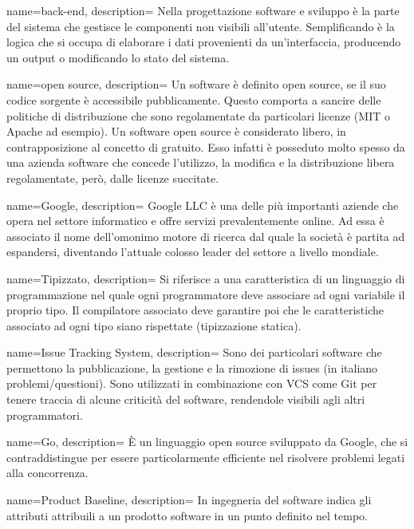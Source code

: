 {
  name=back-end,
  description={ Nella progettazione software e sviluppo è la parte del sistema che gestisce le componenti non visibili all'utente.
  Semplificando è la logica che si occupa di elaborare i dati provenienti da un'interfaccia, producendo un output o modificando lo stato del
  sistema. }
}

{
  name=open source,
  description={ Un software è definito open source, se il suo codice sorgente è accessibile pubblicamente. Questo comporta a sancire delle politiche di
  distribuzione che sono regolamentate da particolari licenze (MIT o Apache ad esempio). Un software open source è considerato libero, in
  contrapposizione al concetto di gratuito. Esso infatti è posseduto molto spesso da una azienda software che concede l'utilizzo, la
  modifica e la distribuzione libera regolamentate, però, dalle licenze succitate.  }
}

{
  name=Google,
  description={ Google LLC è una delle più importanti aziende che opera nel settore informatico e offre servizi prevalentemente online. Ad
  essa è associato il nome dell'omonimo motore di ricerca dal quale la società è partita ad espandersi, diventando l'attuale colosso leader
  del settore a livello mondiale.  }
}

{
  name=Tipizzato,
  description= { Si riferisce a una caratteristica di un linguaggio di programmazione nel quale ogni programmatore deve associare ad ogni
  variabile il proprio tipo. Il compilatore associato deve garantire poi che le caratteristiche associato ad ogni tipo siano rispettate
  (tipizzazione statica).  }
}

{
  name=Issue Tracking System,
  description={ Sono dei particolari software che permettono la pubblicazione, la gestione e la rimozione di issues (in italiano
  problemi/questioni). Sono utilizzati in combinazione con VCS come Git per tenere traccia di alcune criticità del software, rendendole
  visibili agli altri programmatori. }
}

{
  name=Go,
  description={ È un linguaggio open source sviluppato da Google, che si contraddistingue per essere particolarmente efficiente nel
  risolvere problemi legati alla concorrenza.}
}


{
  name=Product Baseline,
  description={ In ingegneria del software indica gli attributi attribuili a un prodotto software in un punto definito nel tempo. }
}

